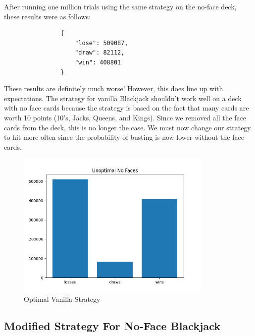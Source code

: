 \documentclass{article}
\begin{document}
        \hspace{-0.5cm}After running one million trials using the same strategy on the no-face deck, these results were as follows:

        \begin{verbatim}
                {
                    "lose": 509087,
                    "draw": 82112,
                    "win": 408801
                }
        \end{verbatim}

		These results are definitely much worse! However, this does line up with expectations. The strategy for vanilla Blackjack shouldn't 
		work well on a deck with no face cards because the strategy is based on the fact that many cards are worth 10 points (10's, Jacks, 
		Queens, and Kings). Since we removed all the face cards from the deck, this is no longer the case. We must now change our strategy to 
		hit more often since the probability of busting is now lower without the face cards.
        
		\begin{figure}
			\hypertarget{fig2}{}
			\begin{center}
				\includegraphics[width=9.5cm]{unoptimalNF.png}
			\end{center}
			\vspace{-10mm}
			\caption{Optimal Vanilla Strategy}
		\end{figure}
        
        \subsection{Modified Strategy For No-Face Blackjack}
		\label{Modified Strategy For No-Face Blackjack}
		\vspace{1cm}
        
\end{document}
